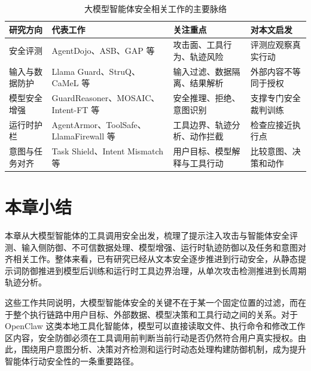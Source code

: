 \begin{table}[htbp]
  \centering
  \caption{大模型智能体安全相关工作的主要脉络}
  \label{tab:related-work-map}
  \small
  \renewcommand{\arraystretch}{1.25}
  \begin{tabular}{@{}p{}p{}p{}p{}@{}}
    \toprule
    研究方向 & 代表工作 & 关注重点 & 对本文启发 \\
    \midrule
    安全评测 &
    AgentDojo、ASB、GAP 等 &
    攻击面、工具行为、轨迹风险 &
    评测应观察真实行动 \\
    输入与数据防护 &
    Llama Guard、StruQ、CaMeL 等 &
    输入过滤、数据隔离、结果解析 &
    外部内容不等同于授权 \\
    模型安全增强 &
    GuardReasoner、MOSAIC、Intent-FT 等 &
    安全推理、拒绝、意图识别 &
    支撑专门安全裁判训练 \\
    运行时护栏 &
    AgentArmor、ToolSafe、LlamaFirewall 等 &
    工具边界、轨迹分析、动作拦截 &
    检查应接近执行点 \\
    意图与任务对齐 &
    Task Shield、Intent Mismatch 等 &
    用户目标、模型解释与工具行动 &
    比较意图、决策和动作 \\
    \bottomrule
  \end{tabular}
\end{table}

\section{本章小结}

本章从大模型智能体的工具调用安全出发，梳理了提示注入攻击与智能体安全评测、输入侧防御、不可信数据处理、模型增强、运行时轨迹防御以及任务和意图对齐相关工作。整体来看，已有研究已经从文本安全逐步推进到行动安全，从静态提示词防御推进到模型后训练和运行时工具边界治理，从单次攻击检测推进到长周期轨迹分析。

这些工作共同说明，大模型智能体安全的关键不在于某一个固定位置的过滤，而在于整个执行链路中用户目标、外部数据、模型决策和工具行动之间的关系。对于 OpenClaw 这类本地工具化智能体，模型可以直接读取文件、执行命令和修改工作区内容，安全防御必须在工具调用前判断当前行动是否仍然符合用户真实授权。由此，围绕用户意图分析、决策对齐检测和运行时动态处理构建防御机制，成为提升智能体行动安全性的一条重要路径。
